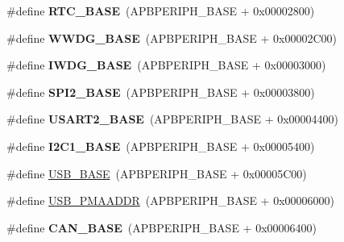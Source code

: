 \begin{DoxyCompactItemize}
\item 
\mbox{\label{group___peripheral__memory__map_ga4265e665d56225412e57a61d87417022}} 
\#define {\bfseries R\+T\+C\+\_\+\+B\+A\+SE}~(A\+P\+B\+P\+E\+R\+I\+P\+H\+\_\+\+B\+A\+SE + 0x00002800)
\item 
\mbox{\label{group___peripheral__memory__map_ga9a5bf4728ab93dea5b569f5b972cbe62}} 
\#define {\bfseries W\+W\+D\+G\+\_\+\+B\+A\+SE}~(A\+P\+B\+P\+E\+R\+I\+P\+H\+\_\+\+B\+A\+SE + 0x00002\+C00)
\item 
\mbox{\label{group___peripheral__memory__map_ga8543ee4997296af5536b007cd4748f55}} 
\#define {\bfseries I\+W\+D\+G\+\_\+\+B\+A\+SE}~(A\+P\+B\+P\+E\+R\+I\+P\+H\+\_\+\+B\+A\+SE + 0x00003000)
\item 
\mbox{\label{group___peripheral__memory__map_gac3e357b4c25106ed375fb1affab6bb86}} 
\#define {\bfseries S\+P\+I2\+\_\+\+B\+A\+SE}~(A\+P\+B\+P\+E\+R\+I\+P\+H\+\_\+\+B\+A\+SE + 0x00003800)
\item 
\mbox{\label{group___peripheral__memory__map_gade83162a04bca0b15b39018a8e8ec090}} 
\#define {\bfseries U\+S\+A\+R\+T2\+\_\+\+B\+A\+SE}~(A\+P\+B\+P\+E\+R\+I\+P\+H\+\_\+\+B\+A\+SE + 0x00004400)
\item 
\mbox{\label{group___peripheral__memory__map_gacd72dbffb1738ca87c838545c4eb85a3}} 
\#define {\bfseries I2\+C1\+\_\+\+B\+A\+SE}~(A\+P\+B\+P\+E\+R\+I\+P\+H\+\_\+\+B\+A\+SE + 0x00005400)
\item 
\#define \hyperlink{group___peripheral__memory__map_gaa6c4cbed4ddbb3ecd77de93fab2a2e04}{U\+S\+B\+\_\+\+B\+A\+SE}~(A\+P\+B\+P\+E\+R\+I\+P\+H\+\_\+\+B\+A\+SE + 0x00005\+C00)
\item 
\#define \hyperlink{group___peripheral__memory__map_gaf992dfdd5707568c5cb5506e2347e808}{U\+S\+B\+\_\+\+P\+M\+A\+A\+D\+DR}~(A\+P\+B\+P\+E\+R\+I\+P\+H\+\_\+\+B\+A\+SE + 0x00006000)
\item 
\mbox{\label{group___peripheral__memory__map_gacbe030cda8eb3031d55a759612a9042d}} 
\#define {\bfseries C\+A\+N\+\_\+\+B\+A\+SE}~(A\+P\+B\+P\+E\+R\+I\+P\+H\+\_\+\+B\+A\+SE + 0x00006400)

\end{DoxyCompactItemize}

